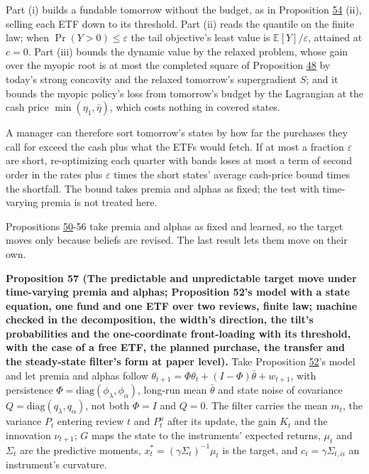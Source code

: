 \documentclass[11pt]{article}
\begin{document}
Part (i) builds a fundable tomorrow without the budget, as in
Proposition \hyperref[res:Proposition-54]{54} (ii), selling each ETF down to its threshold. Part (ii)
reads the quantile on the finite law; when \(\Pr(Y>0)\leq\varepsilon\) the tail
objective's least value is \(\mathbb E[Y]/\varepsilon\), attained at \(c=0\). Part (iii) bounds
the dynamic value by the relaxed problem, whose gain over the myopic
root is at most the completed square of Proposition \hyperref[res:Proposition-48]{48} by today's
strong concavity and the relaxed tomorrow's supergradient \(S\); and it
bounds the myopic policy's loss from tomorrow's budget by the
Lagrangian at the cash price \(\min(\eta_1,\bar\eta)\), which costs nothing in
covered states.

A manager can therefore sort tomorrow's states by how far the
purchases they call for exceed the cash plus what the ETFs would fetch.
If at most a fraction \(\varepsilon\) are short, re-optimizing each quarter with
bands loses at most a term of second order in the rates plus \(\varepsilon\) times
the short states' average cash-price bound times the shortfall. The
bound takes premia and alphas as fixed; the test with time-varying
premia is not treated here.

Propositions \hyperref[res:Proposition-50]{50}-56 take premia and alphas as fixed and learned, so the
target moves only because beliefs are revised. The last result lets
them move on their own.

\label{res:Proposition-57}
\textbf{Proposition 57 (The predictable and unpredictable target move under time-varying premia and alphas; Proposition 52's model with a state equation, one fund and one ETF over two reviews, finite law; machine checked in the decomposition, the width's direction, the tilt's probabilities and the one-coordinate front-loading with its threshold, with the case of a free ETF, the planned purchase, the transfer and the steady-state filter's form at paper level).}
Take Proposition \hyperref[res:Proposition-52]{52}'s model and let premia and alphas follow
\(\theta_{t+1}=\Phi\theta_t+(I-\Phi)\bar\theta+w_{t+1}\), with persistence \(\Phi=\mathrm{diag}(\phi_\lambda,\phi_\alpha)\), long-run mean \(\bar\theta\)
and state noise of covariance \(Q=\mathrm{diag}(q_\lambda,q_\alpha)\), not both \(\Phi=I\) and \(Q=0\). The
filter carries the mean \(m_t\), the variance \(P_t\) entering review \(t\) and \(P^u_t\)
after its update, the gain \(K_t\) and the innovation \(\nu_{t+1}\); \(G\) maps the state
to the instruments' expected returns, \(\mu_t\) and \(\Sigma_t\) are the predictive
moments, \(x^*_t=(\gamma\Sigma_t)^{-1}\mu_t\) is the target, and \(c_t=\gamma\Sigma_{t,ii}\) an instrument's
curvature.
\end{document}
